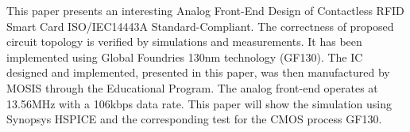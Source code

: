 This paper presents an interesting Analog Front-End Design of Contactless RFID Smart Card ISO/IEC14443A Standard-Compliant. The correctness of proposed circuit topology is verified by simulations and measurements. It has been implemented using Global Foundries 130nm technology (GF130). The IC designed and implemented, presented in this paper, was then manufactured by MOSIS through the Educational Program. The analog front-end operates at 13.56MHz with a 106kbps data rate. This paper will show the simulation using Synopsys HSPICE and the corresponding test for the CMOS process GF130.